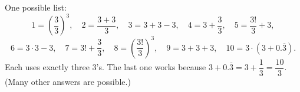 One possible list:
\[1=\left(\dfrac33\right)^3,\quad 2=\dfrac{3+3}{3},\quad 3=3+3-3,\quad 4=3+\dfrac33,\quad 5=\dfrac{3!}{3}+3,\]
\[6=3\cdot3-3,\quad 7=3!+\dfrac33,\quad 8=\left(\dfrac{3!}{3}\right)^3,\quad 9=3+3+3,\quad 10=3\cdot\left(3+0.\overline3\right).\]
Each uses exactly three $3$'s. The last one works because $3+0.\overline3=3+\dfrac13=\dfrac{10}{3}$. (Many other answers are possible.)
